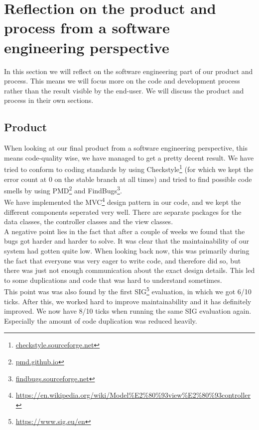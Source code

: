 \section{Reflection on the product and process from a software engineering perspective}

In this section we will reflect on the software engineering part of our product and process. This means we will focus more on the code and development process rather than the result visible by the end-user. We will discuss the product and process in their own sections.

\subsection{Product}
When looking at our final product from a software engineering perspective, this means code-quality wise, we have managed to get a pretty decent result. We have tried to conform to coding standards by using Checkstyle\footnote{\url{checkstyle.sourceforge.net}} (for which we kept the error count at 0 on the stable branch at all times) and tried to find possible code smells by using PMD\footnote{\url{pmd.github.io}} and FindBugs\footnote{\url{findbugs.sourceforge.net}}.\\
We have implemented the MVC\footnote{\url{https://en.wikipedia.org/wiki/Model\%E2\%80\%93view\%E2\%80\%93controller}} design pattern in our code, and we kept the different components seperated very well. There are separate packages for the data classes, the controller classes and the view classes.\\
A negative point lies in the fact that after a couple of weeks we found that the bugs got harder and harder to solve. It was clear that the maintainability of our system had gotten quite low. When looking back now, this was primarily during the fact that everyone was very eager to write code, and therefore did so, but there was just not enough communication about the exact design details. This led to some duplications and code that was hard to understand sometimes.\\
This point was was also found by the first SIG\footnote{\url{https://www.sig.eu/en}} evaluation, in which we got 6/10 ticks. After this, we worked hard to improve maintainability and it has definitely improved. We now have 8/10 ticks when running the same SIG evaluation again. Especially the amount of code duplication was reduced heavily.\\


